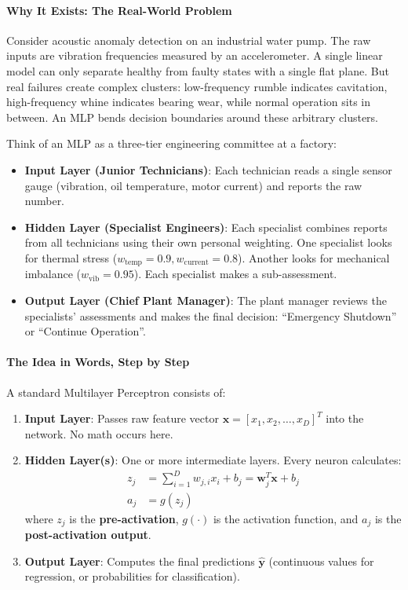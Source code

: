 \paragraph{Why It Exists: The Real-World Problem}
Consider acoustic anomaly detection on an industrial water pump. The raw inputs are vibration frequencies measured by an accelerometer. A single linear model can only separate healthy from faulty states with a single flat plane. But real failures create complex clusters: low-frequency rumble indicates cavitation, high-frequency whine indicates bearing wear, while normal operation sits in between. An MLP bends decision boundaries around these arbitrary clusters.

\begin{analogy}
Think of an MLP as a three-tier engineering committee at a factory:
\begin{itemize}
    \item \textbf{Input Layer (Junior Technicians)}: Each technician reads a single sensor gauge (vibration, oil temperature, motor current) and reports the raw number.
    \item \textbf{Hidden Layer (Specialist Engineers)}: Each specialist combines reports from all technicians using their own personal weighting. One specialist looks for thermal stress ($w_{\text{temp}} = 0.9, w_{\text{current}} = 0.8$). Another looks for mechanical imbalance ($w_{\text{vib}} = 0.95$). Each specialist makes a sub-assessment.
    \item \textbf{Output Layer (Chief Plant Manager)}: The plant manager reviews the specialists' assessments and makes the final decision: ``Emergency Shutdown'' or ``Continue Operation''.
\end{itemize}
\end{analogy}

\paragraph{The Idea in Words, Step by Step}
A standard Multilayer Perceptron consists of:
\begin{enumerate}
    \item \textbf{Input Layer}: Passes raw feature vector $\mathbf{x} = [x_1, x_2, \dots, x_D]^T$ into the network. No math occurs here.
    \item \textbf{Hidden Layer(s)}: One or more intermediate layers. Every neuron calculates:
    \begin{align}
    z_j &= \sum_{i=1}^D w_{j,i} x_i + b_j = \mathbf{w}_j^T \mathbf{x} + b_j\label{eq:neuron_z} \\
    a_j &= g(z_j)\label{eq:neuron_a}
    \end{align}
    where $z_j$ is the \textbf{pre-activation}, $g(\cdot)$ is the activation function, and $a_j$ is the \textbf{post-activation output}.
    \item \textbf{Output Layer}: Computes the final predictions $\hat{\mathbf{y}}$ (continuous values for regression, or probabilities for classification).
\end{enumerate}

